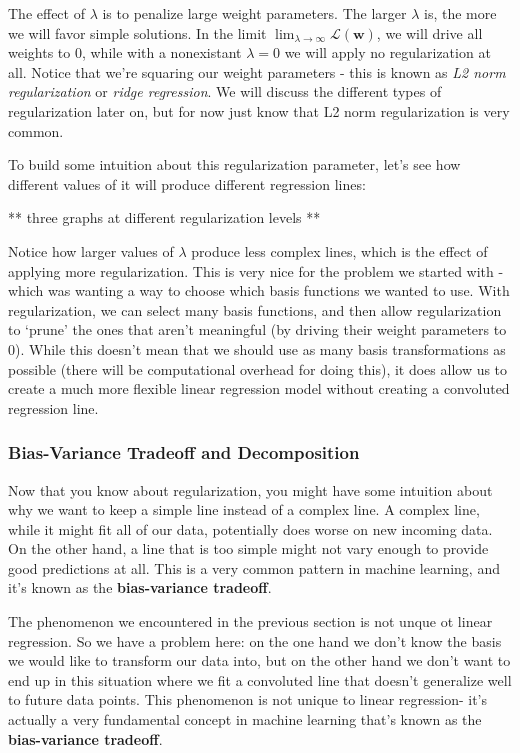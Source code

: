 The effect of $\lambda$ is to penalize large weight parameters. The larger $\lambda$ is, the more we will favor simple solutions. In the limit $\lim_{\lambda\to\infty} \mathcal{L}(\textbf{w})$, we will drive all weights to 0, while with a nonexistant $\lambda = 0$ we will apply no regularization at all. Notice that we're squaring our weight parameters - this is known as \textit{L2 norm regularization} or \textit{ridge regression}. We will discuss the different types of regularization later on, but for now just know that L2 norm regularization is very common.

To build some intuition about this regularization parameter, let's see how different values of it will produce different regression lines:

** three graphs at different regularization levels **

Notice how larger values of $\lambda$ produce less complex lines, which is the effect of applying more regularization. This is very nice for the problem we started with - which was wanting a way to choose which basis functions we wanted to use. With regularization, we can select many basis functions, and then allow regularization to `prune' the ones that aren't meaningful (by driving their weight parameters to 0). While this doesn't mean that we should use as many basis transformations as possible (there will be computational overhead for doing this), it does allow us to create a much more flexible linear regression model without creating a convoluted regression line.

\subsubsection{Bias-Variance Tradeoff and Decomposition}
Now that you know about regularization, you might have some intuition about why we want to keep a simple line instead of a complex line. A complex line, while it might fit all of our data, potentially does worse on new incoming data. On the other hand, a line that is too simple might not vary enough to provide good predictions at all. This is a very common pattern in machine learning, and it's known as the \textbf{bias-variance tradeoff}.

The phenomenon we encountered in the previous section is not unque ot linear regression. So we have a problem here: on the one hand we don't know the basis we would like to transform our data into, but on the other hand we don't want to end up in this situation where we fit a convoluted line that doesn't generalize well to future data points. This phenomenon is not unique to linear regression- it's actually a very fundamental concept in machine learning that's known as the \textbf{bias-variance tradeoff}.

